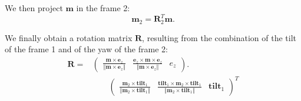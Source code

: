 \documentclass{IJCAS}
\begin{document}
We then project $\boldsymbol{m}$ in the frame 2:
\begin{equation}
    \boldsymbol{m}_2 = \boldsymbol{R}_2^T \boldsymbol{m}.
\end{equation}

We finally obtain a rotation matrix $\boldsymbol{R}$, resulting from the combination of the tilt of the frame 1 and of the yaw of the frame 2:
\begin{align}
    \boldsymbol{R} = &\left(\begin{array}{ccc}
    \frac{\boldsymbol{m} \times \boldsymbol{e}_z}{\left\Vert \boldsymbol{m} \times \boldsymbol{e}_z \right\Vert} & 
    \frac{\boldsymbol{e}_z \times \boldsymbol{m} \times \boldsymbol{e}_z}{\left\Vert \boldsymbol{m} \times \boldsymbol{e}_z \right\Vert} & 
    e_z
    \end{array}\right) . \nonumber \\ 
    & \qquad \left(\begin{array}{ccc} 
    \frac{\boldsymbol{m}_2 \times \boldsymbol{tilt}_{1}}{\left\Vert \boldsymbol{m}_2 \times \boldsymbol{tilt}_{1} \right\Vert} & 
    \frac{\boldsymbol{tilt}_{1} \times \boldsymbol{m}_2 \times \boldsymbol{tilt}_{1}}{\left\Vert \boldsymbol{m}_2 \times \boldsymbol{tilt}_{1} \right\Vert} & 
    \boldsymbol{tilt}_{1}
    \end{array}\right)^T \label{eq:axis_agnostic_R} 
\end{align}
\end{document}
